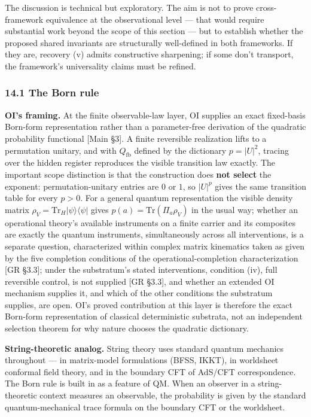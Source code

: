 \documentclass[
]{article}
\begin{document}
The discussion is technical but exploratory. The aim is not to prove
cross-framework equivalence at the observational level --- that would
require substantial work beyond the scope of this section --- but to
establish whether the proposed shared invariants are structurally
well-defined in both frameworks. If they are, recovery (v) admits
constructive sharpening; if some don't transport, the framework's
universality claims must be refined.

\hypertarget{the-born-rule}{%
\subsubsection{14.1 The Born rule}\label{the-born-rule}}

\textbf{OI's framing.} At the finite observable-law layer, OI supplies
an exact fixed-basis Born-form representation rather than a
parameter-free derivation of the quadratic probability functional
{[}Main §3{]}. A finite reversible realization lifts to a permutation
unitary, and with \(Q_{\mathrm{fb}}\) defined by the dictionary
\(p=|U|^2\), tracing over the hidden register reproduces the visible
transition law exactly. The important scope distinction is that the
construction does \textbf{not select} the exponent: permutation-unitary
entries are \(0\) or \(1\), so \(|U|^p\) gives the same transition table
for every \(p>0\). For a general quantum representation the visible
density matrix \(\rho_V = \text{Tr}_H |\psi\rangle\langle\psi|\) gives
\(p(a)=\text{Tr}(\Pi_a\rho_V)\) in the usual way; whether an operational
theory's available instruments on a finite carrier and its composites
are exactly the quantum instruments, simultaneously across all
interventions, is a separate question, characterized within complex
matrix kinematics taken as given by the five completion conditions of
the operational-completion characterization {[}GR §3.3{]}; under the
substratum's stated interventions, condition (iv), full reversible
control, is not supplied {[}GR §3.3{]}, and whether an extended OI
mechanism supplies it, and which of the other conditions the substratum
supplies, are open. OI's proved contribution at this layer is therefore
the exact Born-form representation of classical deterministic substrata,
not an independent selection theorem for why nature chooses the
quadratic dictionary.

\textbf{String-theoretic analog.} String theory uses standard quantum
mechanics throughout --- in matrix-model formulations (BFSS, IKKT), in
worldsheet conformal field theory, and in the boundary CFT of AdS/CFT
correspondence. The Born rule is built in as a feature of QM. When an
observer in a string-theoretic context measures an observable, the
probability is given by the standard quantum-mechanical trace formula on
the boundary CFT or the worldsheet.
\end{document}
